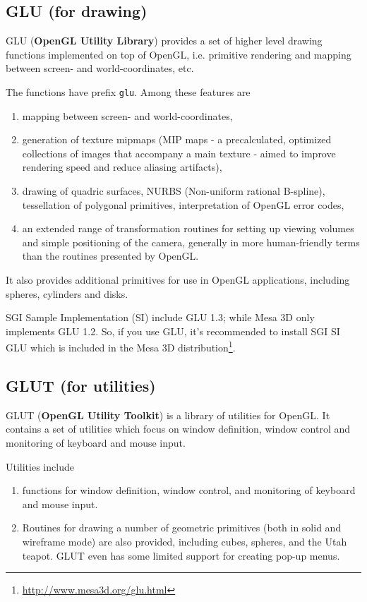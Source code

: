 \subsection{GLU (for drawing)}
\label{sec:glu}

GLU ({\bf OpenGL Utility Library}) provides a set of higher level drawing
functions implemented on top of OpenGL, i.e.
primitive rendering and mapping between screen- and world-coordinates, etc.

The functions have prefix \verb!glu!. Among these features are
\begin{enumerate}
\item mapping between screen-
  and world-coordinates, 
\item generation of texture mipmaps (MIP maps - a precalculated,
  optimized collections of images that accompany a main texture -
  aimed to improve rendering speed and reduce aliasing artifacts),
\item drawing of quadric surfaces, NURBS (Non-uniform rational
  B-spline), tessellation of polygonal primitives, interpretation of
  OpenGL error codes, 

\item an extended range of transformation routines for setting up
  viewing volumes and simple positioning of the camera, generally in
  more human-friendly terms than the routines presented by OpenGL. 
\end{enumerate}
It also provides additional primitives for use in OpenGL applications,
including spheres, cylinders and disks.

\begin{framed}
  SGI Sample Implementation (SI) include GLU 1.3; while Mesa 3D only
  implements GLU 1.2. So, if you use GLU, it's recommended to install
  SGI SI GLU which is included in the Mesa 3D
  distribution\footnote{\url{http://www.mesa3d.org/glu.html}}.
\end{framed}

\subsection{GLUT (for utilities)}
\label{sec:glut-2}

GLUT ({\bf OpenGL Utility Toolkit}) is a library of utilities for OpenGL.
It contains a set of utilities which focus on window definition, window control
and monitoring of keyboard and mouse input.

Utilities include
\begin{enumerate}
\item functions for window definition, window control, and monitoring
  of keyboard and mouse input.
\item Routines for drawing a number of geometric primitives (both in
  solid and wireframe mode) are also provided, including cubes,
  spheres, and the Utah teapot. GLUT even has some limited support for
  creating pop-up menus.
\end{enumerate}

